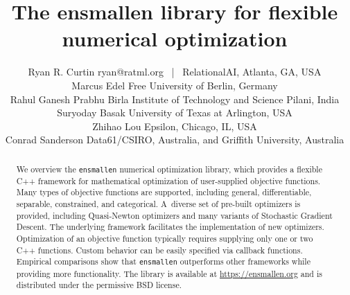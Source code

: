 \documentclass[twoside,11pt]{article}
\begin{document}
\title{The ensmallen library for flexible numerical optimization }

\author{%
  \name Ryan R. Curtin \hfill \email ryan@ratml.org ~|~ \addr RelationalAI, Atlanta, GA, USA\\
  \name Marcus Edel \hfill \addr Free University of Berlin, Germany\\
  \name Rahul Ganesh Prabhu \hfill \addr Birla Institute of Technology and Science Pilani, India\\
  \name Suryoday Basak \hfill \addr University of Texas at Arlington, USA\\
  \name Zhihao Lou \hfill \addr Epsilon, Chicago, IL, USA\\
  \name Conrad Sanderson \hfill \addr Data61/CSIRO, Australia, and Griffith University, Australia%
  }



\maketitle

\begin{abstract}%
We overview the {\tt ensmallen} numerical optimization library,
which provides a flexible C++ framework
for mathematical optimization of user-supplied objective functions.
Many types of objective functions are supported,
including general, differentiable, separable, constrained, and categorical.
A~diverse set of pre-built optimizers is provided,
including Quasi-Newton optimizers and many variants of Stochastic Gradient Descent.
The underlying framework facilitates the implementation of new optimizers.
Optimization of an objective function typically requires supplying only one or two {C++} functions.
Custom behavior can be easily specified via callback functions.
Empirical comparisons show that {\tt ensmallen}
outperforms other frameworks while providing more functionality.
The library is available at \url{https://ensmallen.org}
and is distributed under the permissive BSD license.

\end{abstract}
\end{document}
